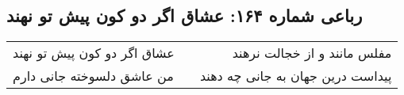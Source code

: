 \begin{center}
\section*{رباعی شماره ۱۶۴: عشاق اگر دو کون پیش تو نهند}
\label{sec:sh164}
\begin{longtable}{l p{0.5cm} r}
عشاق اگر دو کون پیش تو نهند
&&
مفلس مانند و از خجالت نرهند
\\
من عاشق دلسوخته جانی دارم
&&
پیداست درین جهان به جانی چه دهند
\\
\end{longtable}
\end{center}
